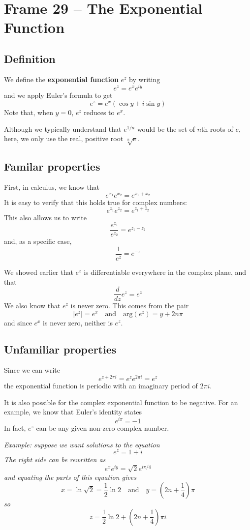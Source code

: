 \documentclass{article}
\renewcommand{\emph}{\textbf}
\begin{document}
\section{Frame 29 -- The Exponential Function}
\subsection{Definition}
We define the \emph{exponential function} $e^z$ by writing
\[
	e^z = e^x e^{iy}
\]
and we apply Euler's formula to get
\[
	e^z = e^x (\cos y + i \sin y)
\]
Note that, when $y = 0$, $e^z$ reduces to $e^x$. 

Although we typically understand that $e^{1/n}$ would be the set of $n$th roots of $e$, here, we only use the real, positive root $\sqrt[n]{e}$.

\subsection{Familar properties}
First, in calculus, we know that
\[
	e^{x_1} e^{x_2} = e^{x_1 + x_2}
\]
It is easy to verify that this holds true for complex numbers:
\[
	e^{z_1} e^{z_2} = e^{z_1 + z_2}
\]
This also allows us to write
\[
	\frac{e^{z_1}}{e^{z_2}} = e^{z_1 - z_2}
\]
and, as a specific case,
\[
	\frac{1}{e^{z}} = e^{-z}
\]

We showed earlier that $e^z$ is differentiable everywhere in the complex plane, and that
\[
	\frac{d}{dz} e^z = e^z
\]
We also know that $e^z$ is never zero. This comes from the pair
\[
	|e^z| = e^x	\quad \text{and} \quad	\text{arg}(e^z) = y + 2n\pi
\]
and since $e^x$ is never zero, neither is $e^z$.

\subsection{Unfamiliar properties}
Since we can write
\[
	e^{z + 2\pi i} = e^z e^{2\pi i} = e^z
\]
the exponential function is periodic with an imaginary period of $2\pi i$.

It is also possible for the complex exponential function to be negative. For an example, we know that Euler's identity states
\[
	e^{i\pi} = -1
\]
In fact, $e^z$ can be any given non-zero complex number.

\textit{Example: suppose we want solutions to the equation
\[
	e^z = 1 + i
\]
The right side can be rewritten as
\[
	e^x e^{iy} = \sqrt{2} e^{i\pi / 4}
\]
and equating the parts of this equation gives
\[
	x = \ln \sqrt{2} = \frac{1}{2} \ln 2 \quad	\text{and} \quad 
	y = \left(2n + \frac{1}{4}\right) \pi
\]
so
\[
	z = \frac{1}{2} \ln 2 + \left( 2n + \frac{1}{4} \right) \pi i
\]}
\end{document}
